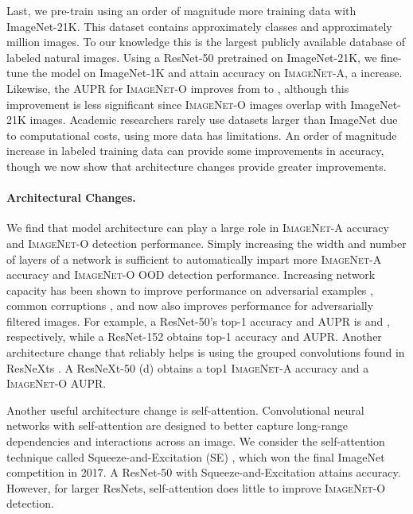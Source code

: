 \documentclass[10pt,twocolumn,letterpaper]{article}
\begin{document}
Last, we pre-train using an order of magnitude more training data with ImageNet-21K. This dataset contains approximately  classes and approximately  million images. To our knowledge this is the largest publicly available database of labeled natural images. Using a ResNet-50 pretrained on ImageNet-21K, we fine-tune the model on ImageNet-1K and attain  accuracy on \textsc{ImageNet-A}, a  increase. Likewise, the AUPR for \textsc{ImageNet-O} improves from  to , although this improvement is less significant since \textsc{ImageNet-O} images overlap with ImageNet-21K images. Academic researchers rarely use datasets larger than ImageNet due to computational costs, using more data has limitations. An order of magnitude increase in labeled training data can provide some improvements in accuracy, though we now show that architecture changes provide greater improvements.


\paragraph{Architectural Changes.}
We find that model architecture can play a large role in \textsc{ImageNet-A} accuracy and \textsc{ImageNet-O} detection performance.
Simply increasing the width and number of layers of a network is sufficient to automatically impart more \textsc{ImageNet-A} accuracy and \textsc{ImageNet-O} OOD detection performance. Increasing network capacity has been shown to improve performance on  adversarial examples \cite{kurakin}, common corruptions \cite{hendrycks2019robustness}, and now also improves performance for adversarially filtered images. For example, a ResNet-50's top-1 accuracy and AUPR is  and , respectively, while a ResNet-152 obtains  top-1 accuracy and  AUPR. Another architecture change that reliably helps is using the grouped convolutions found in ResNeXts \cite{resnext}. A ResNeXt-50 (d) obtains a  top1 \textsc{ImageNet-A} accuracy and a  \textsc{ImageNet-O} AUPR.

Another useful architecture change is self-attention.
Convolutional neural networks with self-attention \cite{Hu2018GatherExciteE} are designed to better capture long-range dependencies and interactions across an image. We consider the self-attention technique called Squeeze-and-Excitation (SE) \cite{Hu2018SqueezeandExcitationN}, which won the final ImageNet competition in 2017. A ResNet-50 with Squeeze-and-Excitation attains  accuracy. However, for larger ResNets, self-attention does little to improve \textsc{ImageNet-O} detection.
\end{document}
